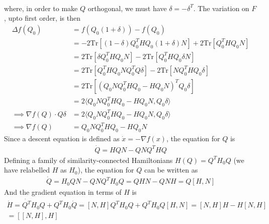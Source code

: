 \documentclass[12pt,twoside]{article}
\numberwithin{equation}{section}
\begin{document}
{\begin{equation}
\begin{aligned}
\end{aligned}\end{equation}
where, in order to make \(Q\) orthogonal, we must have \(\delta = -\delta^T\). The variation on \(F\), upto first order, is then
\begin{equation}\begin{aligned}
	\Delta f(Q_0) &= f(Q_0(1+\delta)) - f(Q_0)\\
		      &= - 2\text{Tr}\left[\left(1-\delta\right)Q^T_0HQ_0\left(1+\delta\right)N \right] + 2\text{Tr}\left[ Q_0^THQ_0N \right]\\
		      &= 2\text{Tr}\left[\delta Q_0^T H Q_0 N \right] - 2\text{Tr}\left[Q^T_0 HQ_0\delta N \right]\\
		      &= 2\text{Tr}\left[Q_0^T H Q_0 N Q_0^T Q\delta\right] - 2\text{Tr}\left[ N Q^T_0 HQ_0\delta\right]\\
		      &= 2\text{Tr}\left[\left(Q_0 N Q_0^T H Q_0 - H Q_0 N\right)^T Q_0 \delta\right]\\
		      &= 2\langle Q_0 N Q_0^T H Q_0 - H Q_0 N, Q_0 \delta\rangle\\
	\implies \nabla f(Q) \cdot Q\delta &= 2\langle Q_0 N Q_0^T H Q_0 - H Q_0 N, Q_0 \delta\rangle\\
	\implies \nabla f(Q) &= Q_0 N Q_0^T H Q_0 - H Q_0 N
\end{aligned}\end{equation}
Since a descent equation is defined as \(\dot x = -\nabla f(x)\), the equation for \(Q\) is 
\begin{equation}\begin{aligned}
	\dot Q = H Q N - Q N Q^T H Q
\end{aligned}\end{equation}
Defining a family of similarity-connected Hamiltonians \(H(Q) = Q^T H_0 Q\) (we have relabelled \(H\) as \(H_0\)), the equation for \(Q\) can be written as
\begin{equation}\begin{aligned}
	\dot Q = H_0 Q N - Q N Q^T H_0 Q = Q H N - Q N H = Q \left[ H, N \right] 
\end{aligned}\end{equation}
And the gradient equation in terms of \(H\) is
\begin{equation}\begin{aligned}
	\dot H = \dot{Q^T}H_0 Q + Q^T H_0 \dot Q =  \left[ N, H \right] Q^T H_0 Q +  Q^T H_0 Q \left[ H, N \right] = \left[ N, H \right] H -  H \left[ N, H \right]\\
	= \left[\left[ N, H \right], H\right] 

\end{aligned}
\end{equation}}
\end{document}
